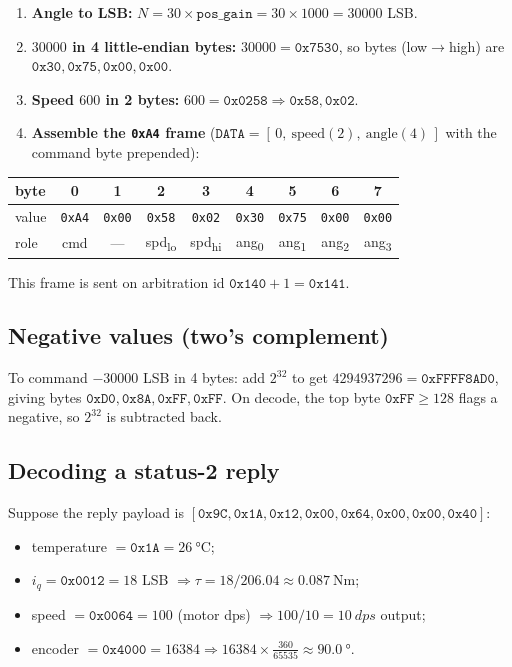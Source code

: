\documentclass[11pt,a4paper]{article}
\begin{document}
\begin{enumerate}[nosep]
  \item \textbf{Angle to LSB:} $N = 30 \times \texttt{pos\_gain} = 30\times 1000 = 30000$ LSB.
  \item \textbf{$30000$ in 4 little-endian bytes:} $30000 = \mathtt{0x7530}$, so
        bytes (low$\to$high) are $\mathtt{0x30},\mathtt{0x75},\mathtt{0x00},\mathtt{0x00}$.
  \item \textbf{Speed $600$ in 2 bytes:} $600=\mathtt{0x0258}\Rightarrow
        \mathtt{0x58},\mathtt{0x02}$.
  \item \textbf{Assemble the \texttt{0xA4} frame} ($\texttt{DATA}=[\,0,\ \text{speed}(2),\ \text{angle}(4)\,]$ with the command byte prepended):
\end{enumerate}
\begin{center}
\begin{tabular}{@{}lcccccccc@{}}
\toprule
byte & 0 & 1 & 2 & 3 & 4 & 5 & 6 & 7\\
\midrule
value & \texttt{0xA4} & \texttt{0x00} & \texttt{0x58} & \texttt{0x02} & \texttt{0x30} & \texttt{0x75} & \texttt{0x00} & \texttt{0x00}\\
role & cmd & --- & spd\textsubscript{lo} & spd\textsubscript{hi} & ang\textsubscript{0} & ang\textsubscript{1} & ang\textsubscript{2} & ang\textsubscript{3}\\
\bottomrule
\end{tabular}
\end{center}
This frame is sent on arbitration id $\mathtt{0x140}+1 = \mathtt{0x141}$.

\subsection{Negative values (two's complement)}
To command $-30000$ LSB in 4 bytes: add $2^{32}$ to get
$4294937296 = \mathtt{0xFFFF8AD0}$, giving bytes
$\mathtt{0xD0},\mathtt{0x8A},\mathtt{0xFF},\mathtt{0xFF}$. On decode, the top byte
$\mathtt{0xFF}\ge 128$ flags a negative, so $2^{32}$ is subtracted back.

\subsection{Decoding a status-2 reply}
Suppose the reply payload is
$[\mathtt{0x9C},\mathtt{0x1A},\mathtt{0x12},\mathtt{0x00},\mathtt{0x64},\mathtt{0x00},\mathtt{0x00},\mathtt{0x40}]$:
\begin{itemize}[nosep]
  \item temperature $=\mathtt{0x1A}=\SI{26}{\celsius}$;
  \item $i_q = \mathtt{0x0012}=18$ LSB $\Rightarrow \tau = 18/206.04 \approx \SI{0.087}{\newton\meter}$;
  \item speed $=\mathtt{0x0064}=100$ (motor dps) $\Rightarrow 100/10 = \SI{10}{dps}$ output;
  \item encoder $=\mathtt{0x4000}=16384 \Rightarrow 16384\times\tfrac{360}{65535}\approx\SI{90.0}{\degree}$.
\end{itemize}
\end{document}
